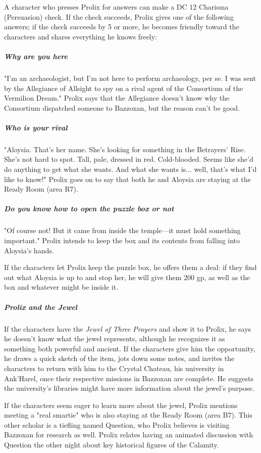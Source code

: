 \documentclass[10pt,a4paper,twoside,bg=print,twocolumn,openany,nodeprecatedcode]{dndbook}
\begin{document}
A character who presses Prolix for answers can make a DC 12 Charisma (Persuasion) check. If the check succeeds, Prolix gives one of the following answers; if the check succeeds by 5 or more, he becomes friendly toward the characters and shares everything he knows freely:

\subparagraph{Why are you here}
"I'm an archaeologist, but I'm not here to perform archaeology, per se. I was sent by the Allegiance of Allsight to spy on a rival agent of the Consortium of the Vermilion Dream." Prolix says that the Allegiance doesn't know why the Consortium dispatched someone to Bazzoxan, but the reason can't be good.

\subparagraph{Who is your rival}
"Aloysia. That's her name. She's looking for something in the Betrayers' Rise. She's not hard to spot. Tall, pale, dressed in red. Cold-blooded. Seems like she'd do anything to get what she wants. And what she wants is... well, that's what I'd like to know!" Prolix goes on to say that both he and Aloysia are staying at the Ready Room (area R7).

\subparagraph{Do you know how to open the puzzle box or not}
"Of course not! But it came from inside the temple—it must hold something important." Prolix intends to keep the box and its contents from falling into Aloysia's hands.

If the characters let Prolix keep the puzzle box, he offers them a deal: if they find out what Aloysia is up to and stop her, he will give them 200 gp, as well as the box and whatever might be inside it.

\subparagraph{Prolix and the Jewel}
If the characters have the \textit{Jewel of Three Prayers} and show it to Prolix, he says he doesn't know what the jewel represents, although he recognizes it as something both powerful and ancient. If the characters give him the opportunity, he draws a quick sketch of the item, jots down some notes, and invites the characters to return with him to the Crystal Chateau, his university in Ank'Harel, once their respective missions in Bazzoxan are complete. He suggests the university's libraries might have more information about the jewel's purpose.

If the characters seem eager to learn more about the jewel, Prolix mentions meeting a "real smartie" who is also staying at the Ready Room (area B7). This other scholar is a tiefling named Question, who Prolix believes is visiting Bazzoxan for research as well. Prolix relates having an animated discussion with Question the other night about key historical figures of the Calamity.
\end{document}
